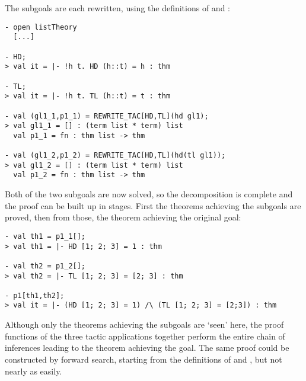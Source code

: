 \noindent The subgoals are each rewritten, using the definitions of
 and :

\begin{session}\begin{verbatim}
- open listTheory
  [...]

- HD;
> val it = |- !h t. HD (h::t) = h : thm

- TL;
> val it = |- !h t. TL (h::t) = t : thm

- val (gl1_1,p1_1) = REWRITE_TAC[HD,TL](hd gl1);
> val gl1_1 = [] : (term list * term) list
  val p1_1 = fn : thm list -> thm

- val (gl1_2,p1_2) = REWRITE_TAC[HD,TL](hd(tl gl1));
> val gl1_2 = [] : (term list * term) list
  val p1_2 = fn : thm list -> thm
\end{verbatim}\end{session}

\noindent Both of the two subgoals are now solved, so the
decomposition is complete and the proof can be built up in stages.
First the theorems achieving the subgoals are proved, then from those,
the theorem achieving the original goal:
\vfill
\newpage
\begin{session}\begin{verbatim}
- val th1 = p1_1[];
> val th1 = |- HD [1; 2; 3] = 1 : thm

- val th2 = p1_2[];
> val th2 = |- TL [1; 2; 3] = [2; 3] : thm

- p1[th1,th2];
> val it = |- (HD [1; 2; 3] = 1) /\ (TL [1; 2; 3] = [2;3]) : thm
\end{verbatim}\end{session}

\noindent Although only the theorems achieving the subgoals are `seen' here,
the proof functions of the three tactic applications together perform
the entire chain
 of inferences leading to the theorem achieving the goal.
The same proof could be constructed by forward search, starting from
the definitions of  and , but not nearly as easily.

